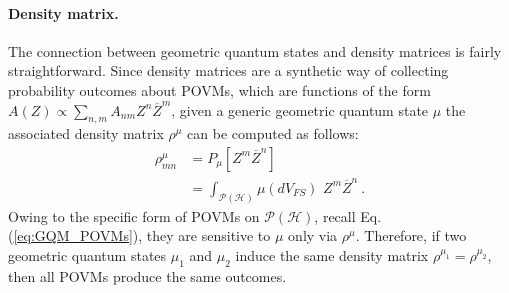 \documentclass[draft,nofootinbib,pre,twocolumn,showpacs,showkeys,preprintnumbers,floatfix]{revtex4-1}
\newcommand{\1}{\mathbbm{1}}
\newcommand{\intP}{\int_{\mathcal{P}(\mathcal{H})} \!\!\!\!\!\!\!\!\!}
\begin{document}
\paragraph*{Density matrix.}
The connection between geometric quantum states and density matrices is
fairly straightforward. Since density matrices are a synthetic way of collecting
probability outcomes about POVMs, which are functions of the 
form $A(Z) \propto \sum_{n,m}A_{n m} Z^n \overline{Z}^m$, 
given a generic geometric quantum state $\mu$ the associated density matrix $\rho^\mu$ can be 
computed as follows:
\begin{align}
\rho^\mu_{mn} & = P_\mu[Z^m \overline{Z}^n] \nonumber \\
  & = \intP \mu(dV_{FS}) \,   \, Z^m \overline{Z}^n
  ~.
\label{eq:densitymatrix}
\end{align}
Owing to the specific form of POVMs on $\mathcal{P}(\mathcal{H})$, recall Eq. (\ref{eq:GQM_POVMs}), they
are sensitive to $\mu$ only via $\rho^\mu$. Therefore, if two geometric quantum states 
$\mu_1$ and $\mu_2$ induce the same density matrix $\rho^{\mu_1} = \rho^{\mu_2}$, then all POVMs
produce the same outcomes.
\end{document}
